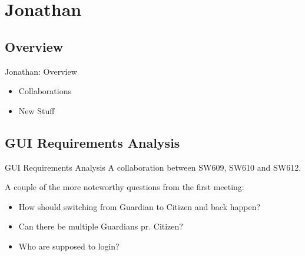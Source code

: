 \section{Jonathan}
\subsection{Overview}
\begin{frame}{Jonathan: Overview}
\begin{itemize}
\item Collaborations
\item New Stuff
\end{itemize}
\end{frame}

\subsection{GUI Requirements Analysis}
\begin{frame}{GUI Requirements Analysis}
A collaboration between SW609, SW610 and SW612.\nl

A couple of the more noteworthy questions from the first meeting:
\begin{itemize}
\item How should switching from Guardian to Citizen and back happen?
\item Can there be multiple Guardians pr. Citizen?
\item Who are supposed to login?
\end{itemize}

\end{frame}

